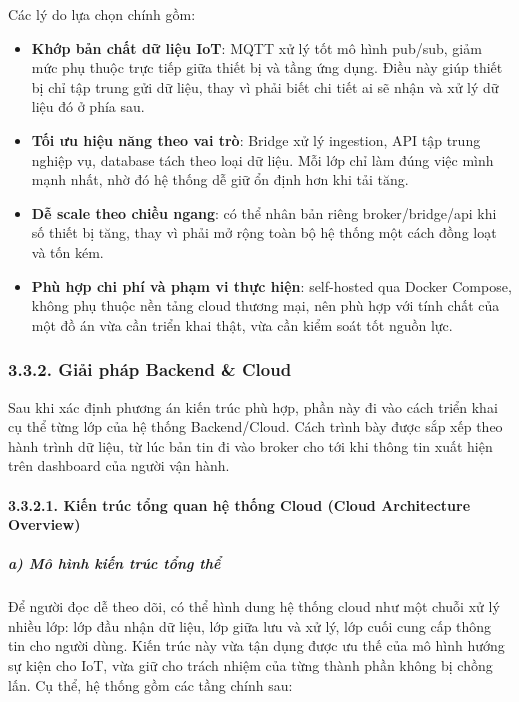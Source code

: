 \documentclass[a4paper]{extarticle}
\providecommand{\tightlist}{%
  \setlength{\itemsep}{0pt}\setlength{\parskip}{0pt}}
\begin{document}
Các lý do lựa chọn chính gồm:

\begin{itemize}
\tightlist
\item
  \textbf{Khớp bản chất dữ liệu IoT}: MQTT xử lý tốt mô hình pub/sub,
  giảm mức phụ thuộc trực tiếp giữa thiết bị và tầng ứng dụng. Điều này
  giúp thiết bị chỉ tập trung gửi dữ liệu, thay vì phải biết chi tiết ai
  sẽ nhận và xử lý dữ liệu đó ở phía sau.
\item
  \textbf{Tối ưu hiệu năng theo vai trò}: Bridge xử lý ingestion, API
  tập trung nghiệp vụ, database tách theo loại dữ liệu. Mỗi lớp chỉ làm
  đúng việc mình mạnh nhất, nhờ đó hệ thống dễ giữ ổn định hơn khi tải
  tăng.
\item
  \textbf{Dễ scale theo chiều ngang}: có thể nhân bản riêng
  broker/bridge/api khi số thiết bị tăng, thay vì phải mở rộng toàn bộ
  hệ thống một cách đồng loạt và tốn kém.
\item
  \textbf{Phù hợp chi phí và phạm vi thực hiện}: self-hosted qua Docker
  Compose, không phụ thuộc nền tảng cloud thương mại, nên phù hợp với
  tính chất của một đồ án vừa cần triển khai thật, vừa cần kiểm soát tốt
  nguồn lực.
\end{itemize}

\subsubsection{3.3.2. Giải pháp Backend \&
Cloud}\label{323-giux1ea3i-phuxe1p-backend--cloud}

Sau khi xác định phương án kiến trúc phù hợp, phần này đi vào cách triển
khai cụ thể từng lớp của hệ thống Backend/Cloud. Cách trình bày được sắp
xếp theo hành trình dữ liệu, từ lúc bản tin đi vào broker cho tới khi
thông tin xuất hiện trên dashboard của người vận hành.

\paragraph{3.3.2.1. Kiến trúc tổng quan hệ thống Cloud (Cloud
Architecture
Overview)}\label{3231-kiux1ebfn-truxfac-tux1ed5ng-quan-hux1ec7-thux1ed1ng-cloud-cloud-architecture-overview}

\subparagraph{a) Mô hình kiến trúc tổng
thể}\label{a-muxf4-huxecnh-kiux1ebfn-truxfac-tux1ed5ng-thux1ec3}

Để người đọc dễ theo dõi, có thể hình dung hệ thống cloud như một chuỗi
xử lý nhiều lớp: lớp đầu nhận dữ liệu, lớp giữa lưu và xử lý, lớp cuối
cung cấp thông tin cho người dùng. Kiến trúc này vừa tận dụng được ưu
thế của mô hình hướng sự kiện cho IoT, vừa giữ cho trách nhiệm của từng
thành phần không bị chồng lấn. Cụ thể, hệ thống gồm các tầng chính sau:
\end{document}
